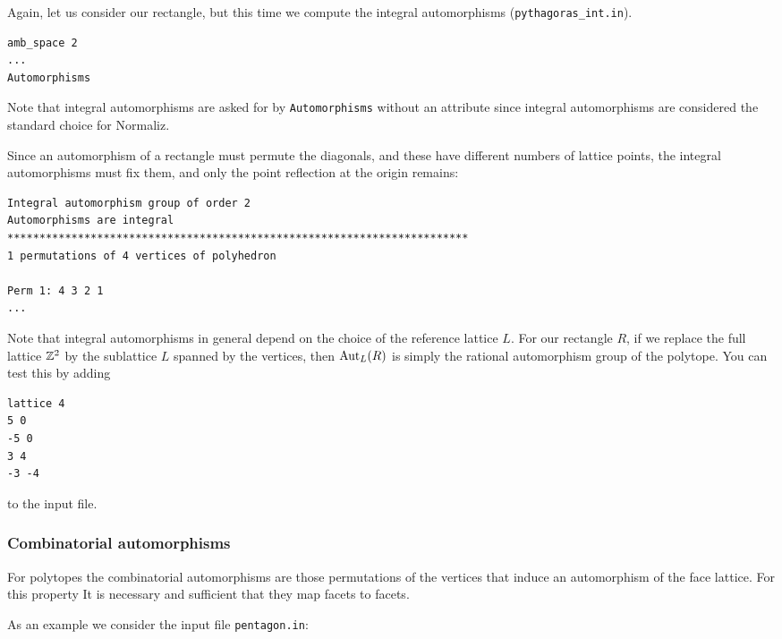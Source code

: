 Again, let us consider our rectangle, but this time we compute the integral automorphisms (\verb|pythagoras_int.in|).
\begin{Verbatim}
amb_space 2
...
Automorphisms
\end{Verbatim}
Note that integral automorphisms are asked for by \verb|Automorphisms| without an attribute since integral automorphisms are considered the standard choice for Normaliz.

Since an automorphism of a rectangle must permute the diagonals, and these have different numbers of lattice points, the integral automorphisms must fix them, and only the point reflection at the origin remains:
\begin{Verbatim}
Integral automorphism group of order 2
Automorphisms are integral
************************************************************************
1 permutations of 4 vertices of polyhedron

Perm 1: 4 3 2 1
...
\end{Verbatim}

Note that integral automorphisms in general depend on the choice of the reference lattice $L$. For our rectangle $R$, if we replace the full lattice ${\mathbb Z}^2$ by the sublattice $L$ spanned by the vertices, then $\operatorname{Aut}_L(R)$ is simply the rational automorphism group of the polytope. You can test this by adding
\begin{Verbatim}
lattice 4
5 0
-5 0
3 4
-3 -4
\end{Verbatim}
to the input file.

\subsubsection{Combinatorial automorphisms}

For polytopes the combinatorial automorphisms are those permutations of the vertices that induce an automorphism of the face lattice. For this property It is necessary and sufficient that they map facets to facets.

As an example we consider the input file \verb|pentagon.in|:

